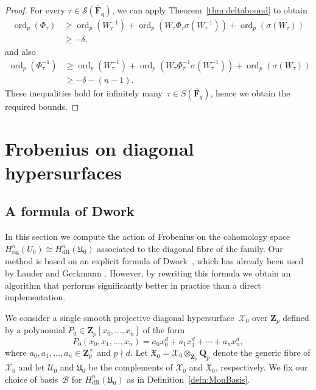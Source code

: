 \documentclass[a4paper,11pt]{article}
\numberwithin{equation}{section}
\newcommand{\ZZ}{\mathbf{Z}} %
\newcommand{\QQ}{\mathbf{Q}} %
\newcommand{\FF}{\mathbf{F}} %
\DeclareMathOperator{\ord}{ord}          %
\providecommand{\HdR}{H_{\text{dR}}}    %
\providecommand{\Hrig}{H_{\text{rig}}}  %
\providecommand{\cB}{\mathcal{B}} %
\theoremstyle{definition}
\begin{document}
\begin{proof}
For every $\tau \in \mathcal{S}(\bar{\FF}_{\mathfrak{q}})$, 
we can apply Theorem~\ref{thm:deltabound} 
to obtain
\begin{align*}
\ord_p(\Phi_{\tau}) &\geq \ord_p(W^{-1}_{\tau}) + 
                          \ord_p(W_{\tau} \Phi_{\tau} \sigma(W_{\tau}^{-1})) + 
                          \ord_p(\sigma(W_{\tau})) \\
                    &\geq -\delta,
\end{align*}
and also
\begin{align*}
\ord_p(\Phi^{-1}_{\tau}) &\geq \ord_p(W^{-1}_{\tau}) + 
                               \ord_p(W_{\tau} \Phi^{-1}_{\tau} \sigma(W_{\tau}^{-1})) + 
                               \ord_p(\sigma(W_{\tau})) \\
                         &\geq -\delta - (n-1).
\end{align*}
These inequalities hold for infinitely many~$\tau \in S(\bar{\FF}_q)$, 
hence we obtain the required bounds.
\end{proof}


\section{Frobenius on diagonal hypersurfaces}
\label{sec:Diagonal}

\subsection{A formula of Dwork}

In this section we compute the action of Frobenius on the cohomology 
space $\Hrig^{n}(U_0) \cong \HdR^{n}(\mathfrak{U}_0)$ associated 
to the diagonal fibre of the family. Our method is based on an 
explicit formula of Dwork~\citep[\S 4]{Dwork1964}, which has already 
been used by Lauder \citep{Lauder2004b} and Gerkmann 
\citep{Gerkmann2007}. However, by rewriting this formula we obtain an 
algorithm that performs significantly better in practice than a direct 
implementation.

We consider a single smooth 
projective diagonal hypersurface~$\mathcal{X}_0$ over $\ZZ_p$ defined by 
a polynomial $P_0 \in \ZZ_p[x_0, \dotsc, x_n]$ of the form
\begin{equation*}
P_0(x_0, x_1, \dotsc, x_n) = 
    a_0 x_0^d + a_1 x_1^d + \dotsb + a_n x_n^d,
\end{equation*}
where $a_0, a_1, \dotsc, a_n \in \ZZ_p^{\times}$ and $p \nmid d$. 
Let $\mathfrak{X}_0 = \mathcal{X}_0 \otimes_{\ZZ_p} \QQ_p$ denote the generic 
fibre of $\mathcal{X}_0$ and let $\mathcal{U}_0$ and $\mathfrak{U}_0$ be the 
complements of $\mathcal{X}_0$ and $\mathfrak{X}_0$, respectively. 
We fix our choice of basis~$\cB$ for $\HdR^{n}(\mathfrak{U}_0)$ 
as in Definition~\ref{defn:MonBasis}. 
\end{document}
